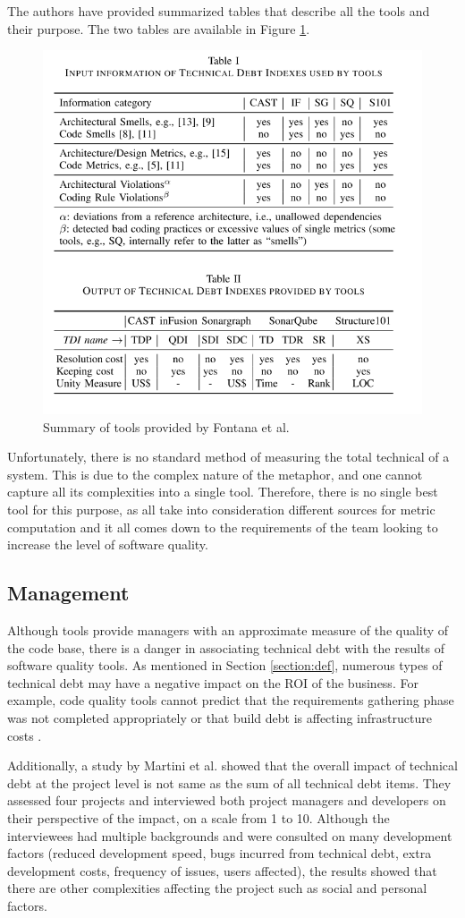 \documentclass{mprop}
\begin{document}
The authors have provided summarized tables that describe all the tools and
their purpose. The two tables are available in Figure \ref{fig:tools-tables}.

\begin{figure}
	\centering
	\includegraphics[width=0.5\linewidth]{visualisations/tools-table.png}
	\caption{Summary of tools provided by Fontana et al.}
	\label{fig:tools-tables}
\end{figure}

Unfortunately, there is no standard method of measuring the total technical of a
system. This is due to the complex nature of the metaphor, and one cannot capture
all its complexities into a single tool. Therefore, there is no single best tool
for this purpose, as all take into consideration different sources for metric
computation and it all comes down to the requirements of the team looking to
increase the level of software quality.

\subsection{Management}

Although tools provide managers with an approximate measure of the quality of
the code base, there is a danger in associating technical debt with the results
of software quality tools. As mentioned in Section \ref{section:def}, numerous
types of technical debt may have a negative impact on the ROI of the business.
For example, code quality tools cannot predict that the requirements gathering
phase was not completed appropriately or that build debt is affecting
infrastructure costs \cite{Morgenthaler2012}.

Additionally, a study by Martini et al. \cite{Martini2017} showed that the
overall impact of technical debt at the project level is not same as the sum of
all technical debt items. They assessed four projects and interviewed both
project managers and developers on their perspective of the impact, on a scale
from 1 to 10. Although the interviewees had multiple backgrounds and were
consulted on many development factors (reduced development speed, bugs incurred
from technical debt, extra development costs, frequency of issues, users
affected), the results showed that there are other complexities affecting the
project such as social and personal factors.
\end{document}
